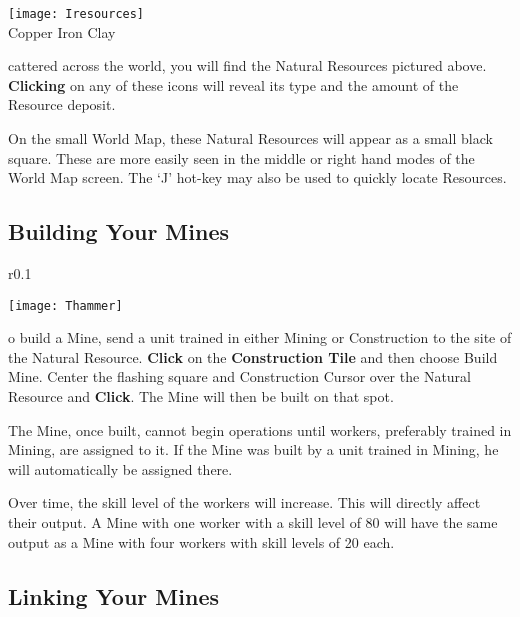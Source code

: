 
\begin{center}
\texttt{[image: Iresources]} %
\\ Copper Iron Clay
\end{center}

cattered across the world, you will find the Natural Resources pictured above. \textbf{Clicking} on any of these icons will reveal its type and the amount of the Resource deposit.

On the small World Map, these Natural Resources will appear as a small black square. These are more easily seen in the middle or right hand modes of the World Map screen. The ‘J’ hot-key may also be used to quickly locate Resources.

\subsection{\textsf{Building Your Mines}}


\begin{wrapfigure}{r}{0.1\textwidth}
    \vspace{-20pt}
    \begin{center}
        \texttt{[image: Thammer]}
    \end{center}
    \vspace{-20pt}
\end{wrapfigure}

o build a Mine, send a unit trained in either Mining or Construction to the site of the Natural Resource. \textbf{Click} on the \textbf{Construction Tile} and then choose Build Mine. Center the flashing square and Construction Cursor over the Natural Resource and \textbf{Click}. The Mine will then be built on that spot.

The Mine, once built, cannot begin operations until workers, preferably trained in Mining, are assigned to it. If the Mine was built by a unit trained in Mining, he will automatically be assigned there.

Over time, the skill level of the workers will increase. This will directly affect their output. A Mine with one worker with a skill level of 80 will have the same output as a Mine with four workers with skill levels of 20 each.

\subsection{\textsf{Linking Your Mines}}

